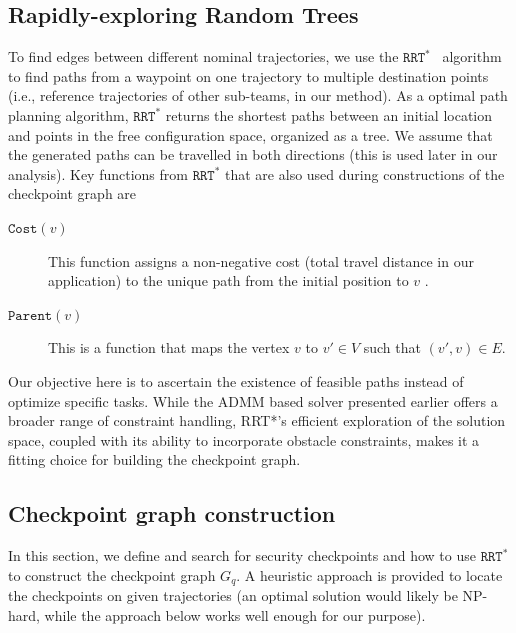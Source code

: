 \documentclass[10pt,twocolumn,twoside]{IEEEtran}
\newcommand{\rrtstar}{$\texttt{RRT}^\texttt{*}$}
\begin{document}
\subsection{Rapidly-exploring Random Trees}
To find edges between different nominal trajectories, we use the \rrtstar{}~\cite{karaman2010incremental} algorithm to find paths from a waypoint on one trajectory to multiple destination points (i.e., reference trajectories of other sub-teams, in our method). As a optimal path planning algorithm, \rrtstar{} returns the shortest paths between an initial location and points in the free configuration space, organized as a tree. We assume that the generated paths can be travelled in both directions (this is used later in our analysis). 
Key functions from \rrtstar{} that are also used during constructions of the checkpoint graph are 
\begin{description}
\item[$\texttt{Cost}(v)$] This function assigns a non-negative cost (total travel distance in our application) to the unique path from the initial position to $v$ . 
\item[$\texttt{Parent}(v)$] This is a function that maps the vertex $v$ to $v'\in V$ such that $(v',v)\in E$.
\end{description}

Our objective here is to ascertain the existence of feasible paths instead of optimize specific tasks. While the ADMM based solver  presented earlier offers a broader range of constraint handling, RRT*'s efficient exploration of the solution space, coupled with its ability to incorporate obstacle constraints, makes it a fitting choice for building the checkpoint graph.

\subsection{Checkpoint graph construction}\label{sec:security-checkpoint}

In this section, we define and search for security checkpoints and how to use \rrtstar{} to construct the checkpoint graph $G_{q}$.
A heuristic approach is provided to locate the checkpoints on given trajectories (an optimal solution would likely be NP-hard, while the approach below works well enough for our purpose). %
\end{document}
